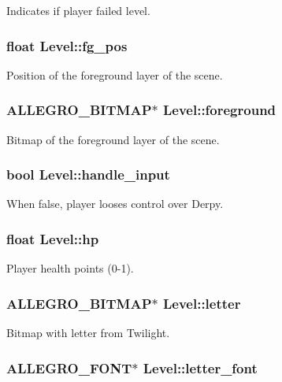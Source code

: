 Indicates if player failed level. \hypertarget{structLevel_a665bb93951ab6b7a91543712152a3acf}{
\subsubsection[{fg\-\_\-pos}]{\setlength{\rightskip}{0pt plus 5cm}float Level\-::fg\-\_\-pos}}\label{structLevel_a665bb93951ab6b7a91543712152a3acf}
Position of the foreground layer of the scene. \hypertarget{structLevel_a26c758ccdc7404a3ee0e766d1cbbf0be}{
\subsubsection[{foreground}]{\setlength{\rightskip}{0pt plus 5cm}A\-L\-L\-E\-G\-R\-O\-\_\-\-B\-I\-T\-M\-A\-P$\ast$ Level\-::foreground}}\label{structLevel_a26c758ccdc7404a3ee0e766d1cbbf0be}
Bitmap of the foreground layer of the scene. \hypertarget{structLevel_a06cf4f2da517284d2006540051d3e5c0}{
\subsubsection[{handle\-\_\-input}]{\setlength{\rightskip}{0pt plus 5cm}bool Level\-::handle\-\_\-input}}\label{structLevel_a06cf4f2da517284d2006540051d3e5c0}
When false, player looses control over Derpy. \hypertarget{structLevel_a49df009e8113251cfcb48fe17df0b571}{
\subsubsection[{hp}]{\setlength{\rightskip}{0pt plus 5cm}float Level\-::hp}}\label{structLevel_a49df009e8113251cfcb48fe17df0b571}
Player health points (0-\/1). \hypertarget{structLevel_af1b1699478b4633d76c01ea09e666df4}{
\subsubsection[{letter}]{\setlength{\rightskip}{0pt plus 5cm}A\-L\-L\-E\-G\-R\-O\-\_\-\-B\-I\-T\-M\-A\-P$\ast$ Level\-::letter}}\label{structLevel_af1b1699478b4633d76c01ea09e666df4}
Bitmap with letter from Twilight. \hypertarget{structLevel_a69e6eae14648fd488a1dec0f55e4d293}{
\subsubsection[{letter\-\_\-font}]{\setlength{\rightskip}{0pt plus 5cm}A\-L\-L\-E\-G\-R\-O\-\_\-\-F\-O\-N\-T$\ast$ Level\-::letter\-\_\-font}}\label{structLevel_a69e6eae14648fd488a1dec0f55e4d293}
